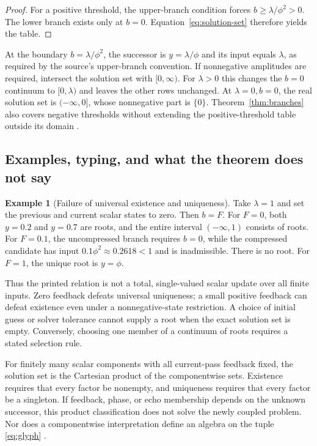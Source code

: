\documentclass[11pt,a4paper]{article}
\theoremstyle{definition}
\newtheorem{example}[theorem]{Example}
\newcommand{\phig}{\phi}
\numberwithin{equation}{section}
\begin{document}
\begin{proof}
For a positive threshold, the upper-branch condition forces
$b\geq\lambda/\phig^2>0$. The lower branch exists only at $b=0$.
Equation~\eqref{eq:solution-set} therefore yields the table.
\end{proof}

At the boundary $b=\lambda/\phig^2$, the successor is
$y=\lambda/\phig$ and its input equals $\lambda$, as required by the
source's upper-branch convention. If nonnegative amplitudes are required,
intersect the solution set with $[0,\infty)$. For $\lambda>0$ this changes the
$b=0$ continuum to $[0,\lambda)$ and leaves the other rows unchanged.
At $\lambda=0,b=0$, the real solution set is $(-\infty,0]$, whose nonnegative
part is $\{0\}$. Theorem~\ref{thm:branches} also covers negative thresholds
without extending the positive-threshold table outside its domain
\cite[\S3.2]{F01}.

\subsection{Examples, typing, and what the theorem does not say}

\begin{example}[Failure of universal existence and uniqueness]
Take $\lambda=1$ and set the previous and current scalar states to zero.
Then $b=F$. For $F=0$, both $y=0.2$ and $y=0.7$ are roots, and the entire
interval $(-\infty,1)$ consists of roots. For $F=0.1$, the uncompressed branch
requires $b=0$, while the compressed candidate has input
$0.1\phig^2\approx0.2618<1$ and is inadmissible. There is no root. For $F=1$,
the unique root is $y=\phig$.
\end{example}

Thus the printed relation is not a total, single-valued scalar update over
all finite inputs. Zero feedback defeats universal uniqueness; a small
positive feedback can defeat existence even under a nonnegative-state
restriction. A choice of initial guess or solver tolerance cannot supply a root when
the exact solution set is empty. Conversely, choosing one member of a
continuum of roots requires a stated selection rule.

For finitely many scalar components with all current-pass feedback fixed,
the solution set is the Cartesian product of the componentwise sets.
Existence requires that every factor be nonempty, and uniqueness requires
that every factor be a singleton. If feedback, phase, or echo membership
depends on the unknown successor, this product classification does not solve
the newly coupled problem. Nor does a componentwise interpretation define an
algebra on the tuple \eqref{eq:glyph} \cite[\S3.2]{F01}.
\end{document}
